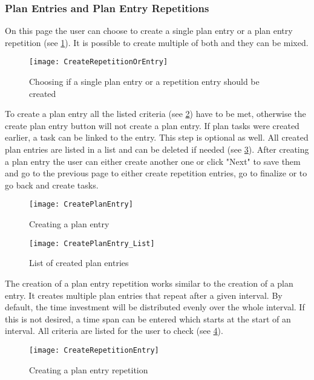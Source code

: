 \subsubsection{Plan Entries and Plan Entry Repetitions}
On this page the user can choose to create a single plan entry or a plan entry repetition (see \ref{createRepetitionOrEntry}). It is possible to create multiple of both and they can be mixed.
\begin{figure}[H]
	\centering
	\texttt{[image: CreateRepetitionOrEntry]}
	\caption{Choosing if a single plan entry or a repetition entry should be created}
	\label{createRepetitionOrEntry}
\end{figure}
To create a plan entry all the listed criteria (see \ref{createPlanEntry}) have to be met, otherwise the create plan entry button will not create a plan entry. If plan tasks were created earlier, a task can be linked to the entry. This step is optional as well. All created plan entries are listed in a list and can be deleted if needed (see \ref{createPlanEntry_List}). After creating a plan entry the user can either create another one or click "Next" to save them and go to the previous page to either create repetition entries, go to finalize or to go back and create tasks.
\begin{figure}[H]
	\centering
	\texttt{[image: CreatePlanEntry]}
	\caption{Creating a plan entry}
	\label{createPlanEntry}
\end{figure}
\begin{figure}[H]
	\centering
	\texttt{[image: CreatePlanEntry\_List]}
	\caption{List of created plan entries}
	\label{createPlanEntry_List}
\end{figure}
The creation of a plan entry repetition works similar to the creation of a plan entry. It creates multiple plan entries that repeat after a given interval. By default, the time investment will be distributed evenly over the whole interval. If this is not desired, a time span can be entered which starts at the start of an interval. All criteria are listed for the user to check (see \ref{createRepetitionEntry}).
\begin{figure}[H]
	\centering
	\texttt{[image: CreateRepetitionEntry]}
	\caption{Creating a plan entry repetition}
	\label{createRepetitionEntry}
\end{figure}

